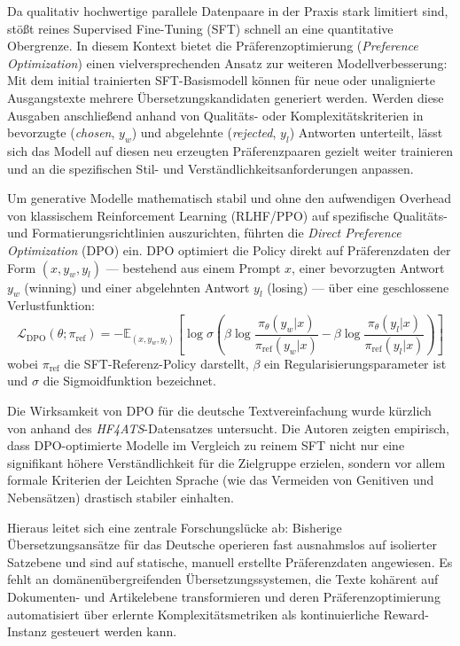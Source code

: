 Da qualitativ hochwertige parallele Datenpaare in der Praxis stark limitiert sind, stößt reines Supervised Fine-Tuning (SFT) schnell an eine quantitative Obergrenze. In diesem Kontext bietet die Präferenzoptimierung (\textit{Preference Optimization}) einen vielversprechenden Ansatz zur weiteren Modellverbesserung: Mit dem initial trainierten SFT-Basismodell können für neue oder unalignierte Ausgangstexte mehrere Übersetzungskandidaten generiert werden. Werden diese Ausgaben anschließend anhand von Qualitäts- oder Komplexitätskriterien in bevorzugte (\textit{chosen}, $y_w$) und abgelehnte (\textit{rejected}, $y_l$) Antworten unterteilt, lässt sich das Modell auf diesen neu erzeugten Präferenzpaaren gezielt weiter trainieren und an die spezifischen Stil- und Verständlichkeitsanforderungen anpassen.

Um generative Modelle mathematisch stabil und ohne den aufwendigen Overhead von klassischem Reinforcement Learning (RLHF/PPO) auf spezifische Qualitäts- und Formatierungsrichtlinien auszurichten, führten \citet{rafailov2023direct} die \textit{Direct Preference Optimization} (DPO) ein. DPO optimiert die Policy direkt auf Präferenzdaten der Form $(x, y_w, y_l)$ — bestehend aus einem Prompt $x$, einer bevorzugten Antwort $y_w$ (winning) und einer abgelehnten Antwort $y_l$ (losing) — über eine geschlossene Verlustfunktion:
\begin{equation}
    \mathcal{L}_{\text{DPO}}(\theta; \pi_{\text{ref}}) = - \mathbb{E}_{(x, y_w, y_l)} \left[ \log \sigma \left( \beta \log \frac{\pi_\theta(y_w | x)}{\pi_{\text{ref}}(y_w | x)} - \beta \log \frac{\pi_\theta(y_l | x)}{\pi_{\text{ref}}(y_l | x)} \right) \right]
\end{equation}
wobei $\pi_{\text{ref}}$ die SFT-Referenz-Policy darstellt, $\beta$ ein Regularisierungsparameter ist und $\sigma$ die Sigmoidfunktion bezeichnet.

Die Wirksamkeit von DPO für die deutsche Textvereinfachung wurde kürzlich von \citet{dpo2025personalizing} anhand des \textit{HF4ATS}-Datensatzes untersucht. Die Autoren zeigten empirisch, dass DPO-optimierte Modelle im Vergleich zu reinem SFT nicht nur eine signifikant höhere Verständlichkeit für die Zielgruppe erzielen, sondern vor allem formale Kriterien der Leichten Sprache (wie das Vermeiden von Genitiven und Nebensätzen) drastisch stabiler einhalten. 

Hieraus leitet sich eine zentrale Forschungslücke ab: Bisherige Übersetzungsansätze für das Deutsche operieren fast ausnahmslos auf isolierter Satzebene und sind auf statische, manuell erstellte Präferenzdaten angewiesen. Es fehlt an domänenübergreifenden Übersetzungssystemen, die Texte kohärent auf Dokumenten- und Artikelebene transformieren und deren Präferenzoptimierung automatisiert über erlernte Komplexitätsmetriken als kontinuierliche Reward-Instanz gesteuert werden kann.
